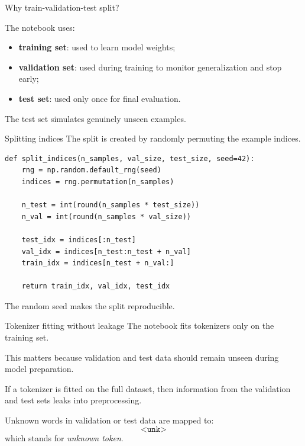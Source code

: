 \documentclass[aspectratio=169]{beamer}
\begin{document}
\begin{frame}[fragile]{Why train-validation-test split?}

\vspace{0.3cm}
The notebook uses:
\begin{itemize}
    \item \textbf{training set}: used to learn model weights;
    \item \textbf{validation set}: used during training to monitor generalization and stop early;
    \item \textbf{test set}: used only once for final evaluation.
\end{itemize}

\vspace{0.3cm}
The test set simulates genuinely unseen examples.
\end{frame}
%
%
\begin{frame}[fragile]{Splitting indices}
The split is created by randomly permuting the example indices.

\begin{lstlisting}
def split_indices(n_samples, val_size, test_size, seed=42):
    rng = np.random.default_rng(seed)
    indices = rng.permutation(n_samples)

    n_test = int(round(n_samples * test_size))
    n_val = int(round(n_samples * val_size))

    test_idx = indices[:n_test]
    val_idx = indices[n_test:n_test + n_val]
    train_idx = indices[n_test + n_val:]

    return train_idx, val_idx, test_idx
\end{lstlisting}

The random seed makes the split reproducible.
\end{frame}
%
%
\begin{frame}[fragile]{Tokenizer fitting without leakage}
The notebook fits tokenizers only on the training set.

\vspace{0.3cm}
This matters because validation and test data should remain unseen during model preparation.

\vspace{0.3cm}
If a tokenizer is fitted on the full dataset, then information from the validation and test sets leaks into preprocessing.

\vspace{0.3cm}
Unknown words in validation or test data are mapped to:
\[
    \texttt{<unk>}
\]
which stands for \textit{unknown token}.
\end{frame}
\end{document}
